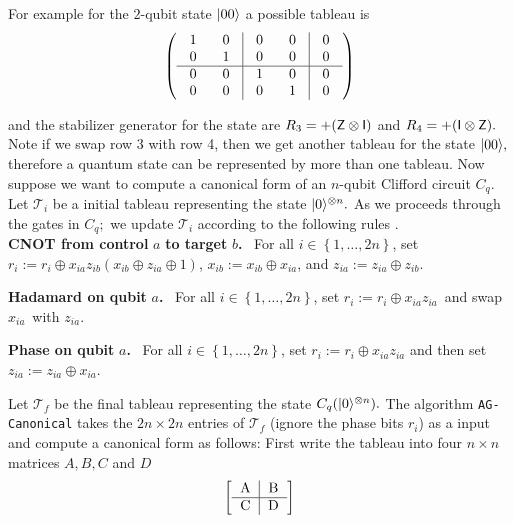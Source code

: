 For example for the $2$-qubit state ${\lvert}00\rangle$ a possible tableau is
\[
\left(
\begin{tabular}
[c]{cc|cc|c}%
$~1~$ & $~0~$ & $~0~$ & $~0~$ & $~0~$\\
$~0~$ & $~1~$ & $~0~$ & $~0~$ & $~0~$\\\hline
$~0~$ & $~0~$ & $~1~$ & $~0~$ & $~0~$\\
$~0~$ & $~0~$ & $~0~$ & $~1~$ & $~0~$%
\end{tabular}
\right)
\]

and the stabilizer generator for the state are $R_3=+({\sf Z} \otimes {\sf I})$ and $R_4=+({\sf I}\otimes {\sf Z}).$ Note if we swap row 3 with row 4, then we get another tableau for the state ${\lvert}00\rangle,$ therefore a quantum state can be represented by more than one tableau. Now suppose we want to compute a canonical form of an $n$-qubit Clifford circuit $C_q.$ Let $\mathcal{T}_i$ be a initial tableau representing the state ${\lvert}0\rangle^{\otimes n}.$ As we proceeds through the gates in $C_q;$ we update $\mathcal{T}_i$  according to the following rules \cite{AG04}.\\


\noindent\textbf{CNOT from control }$a$\textbf{ to target }$b$\textbf{.} \ For
all $i\in\left\{  1,\ldots,2n\right\}  $, set $r_{i}:=r_{i}\oplus x_{ia}%
z_{ib}\left(  x_{ib}\oplus z_{ia}\oplus1\right)  $, $x_{ib}:=x_{ib}\oplus
x_{ia}$, and $z_{ia}:=z_{ia}\oplus z_{ib}$.\medskip

\noindent\textbf{Hadamard on qubit }$a$\textbf{.} \ For all $i\in\left\{
1,\ldots,2n\right\}  $, set $r_{i}:=r_{i}\oplus x_{ia}z_{ia}$\ and swap
$x_{ia}$\ with $z_{ia}$.\medskip

\noindent\textbf{Phase on qubit }$a$\textbf{.} \ For all $i\in\left\{
1,\ldots,2n\right\}  $, set $r_{i}:=r_{i}\oplus x_{ia}z_{ia}$ and then set
$z_{ia}:=z_{ia}\oplus x_{ia}$.\medskip



Let $\mathcal{T}_f$ be the final tableau representing the state $C_q({\lvert}0\rangle^{\otimes n}).$ The algorithm  {\tt AG-Canonical}  takes the $2n\times 2n$ entries of $\mathcal{T}_f$ (ignore the phase bits $r_i$) as a input and compute a canonical form as follows: First write the tableau into four $n\times n$ matrices $A, B, C$ and $D$
\[
\left[
\begin{tabular}
[c]{c|c}
A&B \\\hline
C&D
\end{tabular}
\right]
\]




